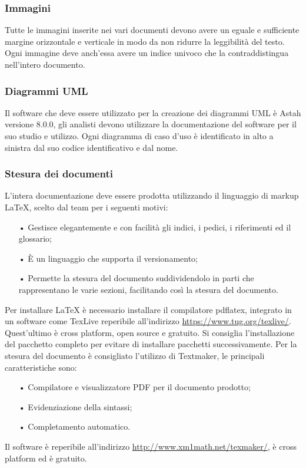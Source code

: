 \subsubsection{Immagini}
Tutte le immagini inserite nei vari documenti devono avere un eguale e sufficiente margine orizzontale e verticale in modo da non ridurre la leggibilità del testo. Ogni immagine deve anch’essa avere un indice univoco che la contraddistingua nell’intero documento.

\subsubsection{Diagrammi UML}
Il software che deve essere utilizzato per la creazione dei diagrammi UML è Astah versione 8.0.0, gli analisti devono utilizzare la documentazione del software per il suo studio e utilizzo.
Ogni diagramma di caso d’uso è identificato in alto a sinistra dal suo codice identificativo e dal nome.

\subsubsection{Stesura dei documenti}
L'intera documentazione deve essere prodotta utilizzando il {linguaggio di markup} \LaTeX{}, scelto dal team per i seguenti motivi:
\begin{itemize}
\item[•] Gestisce elegantemente e con facilità gli indici, i pedici, i riferimenti ed il glossario;
\item[•] È un linguaggio che supporta il {versionamento};
\item[•] Permette la stesura del documento suddividendolo in parti che rappresentano le varie sezioni, facilitando così la stesura del documento.
\end{itemize}
Per installare \LaTeX{} è necessario installare il compilatore pdflatex, integrato in un software come TexLive reperibile all'indirizzo \url{https://www.tug.org/texlive/}. Quest'ultimo è {cross platform}, {open source} e gratuito. Si consiglia l'installazione del pacchetto completo per evitare di installare pacchetti successivamente.
Per la stesura del documento è consigliato l'utilizzo di Textmaker, le principali caratteristiche sono:
\begin{itemize}
	\item[•] Compilatore e visualizzatore {PDF} per il documento prodotto;
	\item[•] Evidenziazione della sintassi;
	\item[•] Completamento automatico.
\end{itemize}  
Il software è reperibile all'indirizzo \url{http://www.xm1math.net/texmaker/}, è {cross platform} ed è gratuito.


